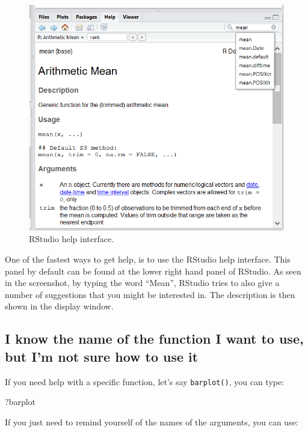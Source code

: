 \documentclass[]{book}
\newenvironment{Shaded}{\begin{snugshade}}{\end{snugshade}}
\newcommand{\NormalTok}[1]{#1}
\begin{document}
\begin{figure}
\centering
\includegraphics{img/rstudiohelp.png}
\caption{RStudio help interface.}
\end{figure}

One of the fastest ways to get help, is to use the RStudio help
interface. This panel by default can be found at the lower right hand
panel of RStudio. As seen in the screenshot, by typing the word
``Mean'', RStudio tries to also give a number of suggestions that you
might be interested in. The description is then shown in the display
window.

\subsection{I know the name of the function I want to use, but I'm not
sure how to use
it}\label{i-know-the-name-of-the-function-i-want-to-use-but-im-not-sure-how-to-use-it}

If you need help with a specific function, let's say \texttt{barplot()},
you can type:

\begin{Shaded}
\begin{Highlighting}[]
\NormalTok{?barplot}
\end{Highlighting}
\end{Shaded}

If you just need to remind yourself of the names of the arguments, you
can use:
\end{document}
